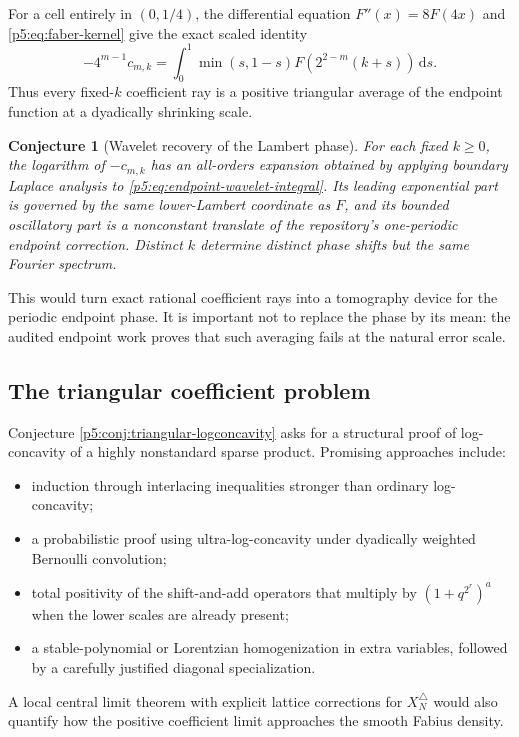 \documentclass[11pt,oneside]{article}
\newtheorem{conjecture}[theorem]{Conjecture}
\theoremstyle{definition}
\newcommand{\dd}{\,\mathrm d}
\begin{document}
For a cell entirely in $(0,1/4)$, the differential equation
$F''(x)=8F(4x)$ and \eqref{p5:eq:faber-kernel} give the exact scaled identity
\begin{equation}
 \boxed{\displaystyle
 -4^{m-1}c_{m,k}
 =\int_0^1\min(s,1-s)
 F\!\left(2^{2-m}(k+s)\right)\dd s.}                    \label{p5:eq:endpoint-wavelet-integral}
\end{equation}
Thus every fixed-$k$ coefficient ray is a positive triangular average of the
endpoint function at a dyadically shrinking scale.

\begin{conjecture}[Wavelet recovery of the Lambert phase]
\label{p5:conj:wavelet-phase}
For each fixed $k\ge0$, the logarithm of
$-c_{m,k}$ has an all-orders expansion obtained by applying boundary Laplace
analysis to \eqref{p5:eq:endpoint-wavelet-integral}.  Its leading exponential
part is governed by the same lower-Lambert coordinate as $F$, and its bounded
oscillatory part is a nonconstant translate of the repository's one-periodic
endpoint correction.  Distinct $k$ determine distinct phase shifts but the
same Fourier spectrum.
\end{conjecture}

This would turn exact rational coefficient rays into a tomography device for
the periodic endpoint phase.  It is important not to replace the phase by its
mean: the audited endpoint work proves that such averaging fails at the
natural error scale.

\subsection{The triangular coefficient problem}

Conjecture \ref{p5:conj:triangular-logconcavity} asks for a structural proof of
log-concavity of a highly nonstandard sparse product.  Promising approaches
include:
\begin{itemize}
\item induction through interlacing inequalities stronger than ordinary
      log-concavity;
\item a probabilistic proof using ultra-log-concavity under dyadically
      weighted Bernoulli convolution;
\item total positivity of the shift-and-add operators that multiply by
      $(1+q^{2^r})^a$ when the lower scales are already present;
\item a stable-polynomial or Lorentzian homogenization in extra variables,
      followed by a carefully justified diagonal specialization.
\end{itemize}
A local central limit theorem with explicit lattice corrections for
$X_N^\triangle$ would also quantify how the positive coefficient limit
approaches the smooth Fabius density.
\end{document}
